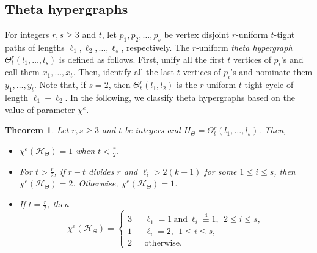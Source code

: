 \documentclass[12pt,a4paper]{article}
\newtheorem{theorem}{\bf Theorem}[section]
\begin{document}
\subsection{Theta hypergraphs}
For integers $ r,s\geq 3 $ and $t$,  let $p_1,p_2, \ldots, p_s$ be vertex disjoint $r$-uniform  $ t$-tight paths of lengths $ \ell_1, \ell_2, \ldots, \ell_s$, respectively.
The $ r$-uniform \textit{theta hypergraph}  $ \Theta_t^r(l_1,\ldots, l_s) $ is defined as  follows. First, unify all the first $ t $ vertices of $ p_i $'s and call them $ x_1,\ldots, x_{t} $. Then, identify  all the last $ t$ vertices of $ p_i $'s and nominate them $ y_1,\ldots, y_t$.  Note that, if $s=2$, then $ \Theta_t^r(l_1, l_2) $ is the $r$-uniform  $t$-tight cycle of length $ \ell_1+\ell_2$.
In the following, we classify theta hypergraphs based on the value of  parameter $ \chi^{e}$.

\begin{theorem}\label{teta}
	Let $r,s \geq 3$ and $t$ be integers and $ H_{\Theta}=\Theta_t^r(l_1,\ldots, l_s) $. Then,
	\begin{itemize}
		\item[i.] $ \chi^{e}(\mathcal{H}_{\Theta})=1$ when $t<\frac{r}{2}$.
		\item[ii.] For $t>\frac{r}{2}$, if $r-t$ divides $r$ and $\ell _i > 2(k-1)$ for some $1\leq i \leq s$, then
		$ \chi^{e}(\mathcal{H}_{\Theta})=2$. Otherwise, $ \chi^{e}(\mathcal{H}_{\Theta})=1$.
		
		\item[iii.]  If $t=\frac{r}{2}$, then
		\begin{equation*}
		\chi^{e}(\mathcal{H}_{\Theta})=
		\left\{
		\begin{array}{cl}
		3 & \ \ \  \ell_1=1\ \text{and}\  \ell_i\overset{4}{\equiv}1,\ \    2\leq i\leq s,\\
		1 & \ \ \   \ell_i=2,\ \  1\leq i\leq s,\\
		2 & \ \ \ \text{otherwise.}
		\end{array}
		\right.
		\end{equation*}
	\end{itemize}
\end{theorem}
\end{document}
